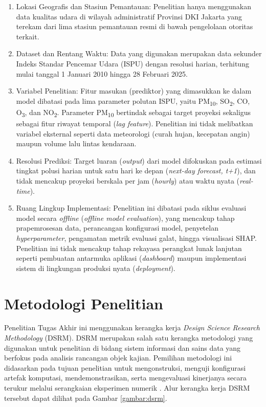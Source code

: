 \begin{enumerate}
   \item {Lokasi Geografis dan Stasiun Pemantauan:} Penelitian hanya menggunakan data kualitas udara di wilayah administratif Provinsi DKI Jakarta yang terekam dari lima stasiun pemantauan resmi di bawah pengelolaan otoritas terkait.
   \item {Dataset dan Rentang Waktu:} Data yang digunakan merupakan data sekunder Indeks Standar Pencemar Udara (ISPU) dengan resolusi harian, terhitung mulai tanggal 1 Januari 2010 hingga 28 Februari 2025.
   \item {Variabel Penelitian:} Fitur masukan (prediktor) yang dimasukkan ke dalam model dibatasi pada lima parameter polutan ISPU, yaitu PM\textsubscript{10}, SO\textsubscript{2}, CO, O\textsubscript{3}, dan NO\textsubscript{2}. Parameter PM\textsubscript{10} bertindak sebagai target proyeksi sekaligus sebagai fitur riwayat temporal (\textit{lag feature}). Penelitian ini tidak melibatkan variabel eksternal seperti data meteorologi (curah hujan, kecepatan angin) maupun volume lalu lintas kendaraan.
   \item {Resolusi Prediksi:} Target luaran (\textit{output}) dari model difokuskan pada estimasi tingkat polusi harian untuk satu hari ke depan (\textit{next-day forecast, t+1}), dan tidak mencakup proyeksi berskala per jam (\textit{hourly}) atau waktu nyata (\textit{real-time}).
   \item {Ruang Lingkup Implementasi:} Penelitian ini dibatasi pada siklus evaluasi model secara \textit{offline} (\textit{offline model evaluation}), yang mencakup tahap prapemrosesan data, perancangan konfigurasi model, penyetelan \textit{hyperparameter}, pengamatan metrik evaluasi galat, hingga visualisasi SHAP. Penelitian ini tidak mencakup tahap rekayasa perangkat lunak lanjutan seperti pembuatan antarmuka aplikasi (\textit{dashboard}) maupun implementasi sistem di lingkungan produksi nyata (\textit{deployment}).
\end{enumerate}

\section{Metodologi Penelitian}

Penelitian Tugas Akhir ini menggunakan kerangka kerja \textit{Design Science Research Methodology} (DSRM). DSRM merupakan salah satu kerangka metodologi yang digunakan untuk penelitian di bidang sistem informasi dan sains data yang berfokus pada analisis rancangan objek kajian. Pemilihan metodologi ini didasarkan pada tujuan penelitian untuk mengonstruksi, menguji konfigurasi artefak komputasi, mendemonstrasikan, serta mengevaluasi kinerjanya secara terukur melalui serangkaian eksperimen numerik \autocite{haryanti2022dsrm}. Alur kerangka kerja DSRM tersebut dapat dilihat pada Gambar \ref{gambar:dsrm}.


